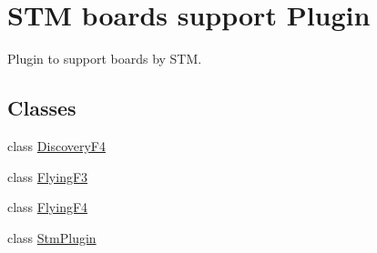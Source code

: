 \hypertarget{group___boards___stm}{\section{\-S\-T\-M boards support \-Plugin}
\label{group___boards___stm}
}


\-Plugin to support boards by \-S\-T\-M.  


\subsection*{\-Classes}
\begin{DoxyCompactItemize}
\item 
class \hyperlink{class_discovery_f4}{\-Discovery\-F4}
\item 
class \hyperlink{class_flying_f3}{\-Flying\-F3}
\item 
class \hyperlink{class_flying_f4}{\-Flying\-F4}
\item 
class \hyperlink{class_stm_plugin}{\-Stm\-Plugin}
\end{DoxyCompactItemize}

